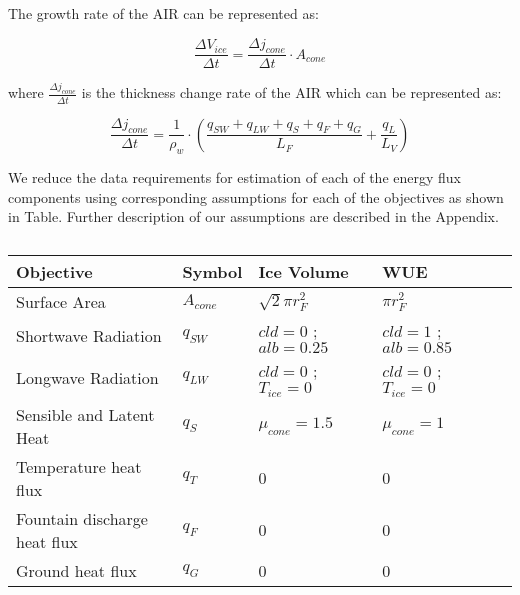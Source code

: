 \documentclass[tc, manuscript]{copernicus}
\begin{document}
The growth rate of the AIR can be represented as: 

\begin{equation}
  \frac{\Delta V_{ice}}{\Delta t}  =  \frac{\Delta j_{cone}}{ \Delta t} \cdot A_{cone}
	\label{eqn:freeze}
\end{equation}

where $\frac{\Delta j_{cone}}{\Delta t}$ is the thickness change rate of the AIR which can be represented as: 

\begin{equation}
  \frac{\Delta j_{cone}}{\Delta t}  = \frac{1}{\rho_w} \cdot (\frac{q_{SW} + q_{LW} + q_{S} + q_{F} + q_{G}}{L_F} + \frac{q_{L}}{L_V} )
	\label{eqn:freeze}
\end{equation}

We reduce the data requirements for estimation of each of the energy flux components using corresponding
assumptions for each of the objectives as shown in Table. Further description of our assumptions are described
in the Appendix. 

\begin{table}[]
\centering
\caption{}
\label{tab:my-table}
\begin{tabular}{@{}lllll@{}}
\toprule
\textbf{Objective} & \textbf{Symbol} & \textbf{Ice Volume} & \textbf{WUE} & \\ \midrule
\multicolumn{1}{|l}{Surface Area}        & $A_{cone}$ & $ \sqrt{2} \pi r_{F}^2$ & $\pi r_{F}^2$ & \multicolumn{1}{l|}{} \\ \midrule
\multicolumn{1}{|l}{Shortwave Radiation} & $q_{SW}$ & $cld = 0$ ; $alb=0.25$ & $cld = 1$ ; $alb=0.85$ & \multicolumn{1}{l|}{} \\ \midrule
\multicolumn{1}{|l}{Longwave Radiation}  & $q_{LW}$ & $cld = 0$ ; $T_{ice} = 0$ & $cld = 0$ ; $T_{ice} = 0$ & \multicolumn{1}{l|}{} \\ \midrule
\multicolumn{1}{|l}{Sensible and Latent Heat}       & $q_{S}$ &$\mu_{cone} = 1.5$  & $\mu_{cone} = 1$ & \multicolumn{1}{l|}{} \\ \midrule
\multicolumn{1}{|l}{Temperature heat flux} & $q_{T}$ & 0 & 0 & \multicolumn{1}{l|}{} \\ \midrule
\multicolumn{1}{|l}{Fountain discharge heat flux} & $q_{F}$ & 0 & 0 & \multicolumn{1}{l|}{} \\ \midrule
\multicolumn{1}{|l}{Ground heat flux}    & $q_{G}$ & 0 & 0 & \multicolumn{1}{l|}{} \\ \bottomrule
\end{tabular}
\end{table}
\end{document}
